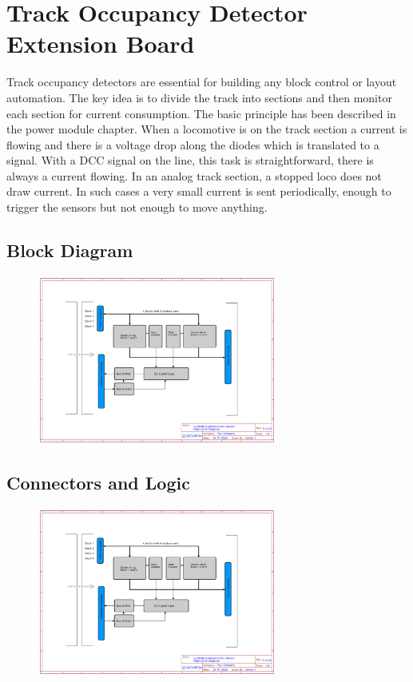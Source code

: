 \chapter{Track Occupancy Detector Extension Board}

Track occupancy detectors are essential for building any block control or layout automation. The key idea is to divide the track into sections and then monitor each section for current consumption. The basic principle has been described in the power module chapter. When a locomotive is on the track section a current is flowing and there is a voltage drop along the diodes which is translated to a signal. With a DCC signal on the line, this task is straightforward, there is always a current flowing. In an analog track section, a stopped loco does not draw current. In such cases a very small current is sent periodically, enough to trigger the sensors but not enough to move anything.

\section{Block Diagram}

\begin{figure}[htbp]
    \centering
    \includegraphics[page=1, width=0.7\textwidth]{./Schematics/Schematic_LcsNodes-Extension-Occ-Detect.pdf}
\end{figure}
\FloatBarrier

\section{Connectors and Logic}

\begin{figure}[htbp]
    \centering
    \includegraphics[page=2, width=0.7\textwidth]{./Schematics/Schematic_LcsNodes-Extension-Occ-Detect.pdf}
\end{figure}
\FloatBarrier


